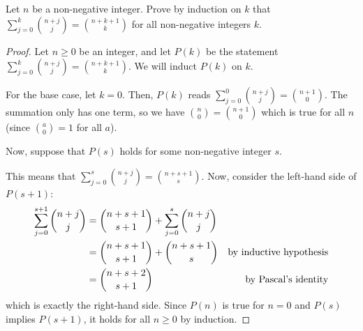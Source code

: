 \question Let $n$ be a non-negative integer.
Prove by induction on $k$ that $\sum^k_{j=0}\binom{n+j}{j} = \binom{n+k+1}{k}$
for all non-negative integers $k$.
\begin{proof}
  Let $n \geq 0$ be an integer, and let $P(k)$ be the statement $\sum^k_{j=0}\binom{n+j}{j} = \binom{n+k+1}{k}$.
  We will induct $P(k)$ on $k$.

  For the base case, let $k=0$.
  Then, $P(k)$ reads $\sum^0_{j=0}\binom{n+j}{j} = \binom{n+1}{0}$.
  The summation only has one term, so we have $\binom{n}{0} = \binom{n+1}{0}$ which is true for all $n$ (since $\binom{a}{0} = 1$ for all $a$).

  Now, suppose that $P(s)$ holds for some non-negative integer $s$.

  This means that $\sum^s_{j=0}\binom{n+j}{j} = \binom{n+s+1}{s}$.
  Now, consider the left-hand side of $P(s+1)$:
  \begin{align*}
    \sum^{s+1}_{j=0}\binom{n+j}{j}
     & = \binom{n+s+1}{s+1} + \sum^s_{j=0}\binom{n+j}{j} \\
     & = \binom{n+s+1}{s+1} + \binom{n+s+1}{s} & \text{by inductive hypothesis}       \\
     & = \binom{n+s+2}{s+1} & \text{by Pascal's identity}       \\
  \end{align*}
  which is exactly the right-hand side.
  Since $P(n)$ is true for $n=0$ and $P(s)$ implies $P(s+1)$, it holds for all $n \geq 0$ by induction.
\end{proof}


